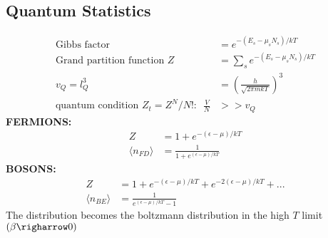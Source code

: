 \documentclass[a4paper, norsk, 8pt]{article}
\begin{document}
\begin{multicols*}{3}
\subsection*{\footnotesize  Quantum Statistics}
\begin{align*}
    \text{Gibbs factor} &= e^{-(E_s - \mu_{s} N_{s})/kT} \\
    \text{Grand partition function}\,\, Z &= \sum_s e^{-(E_s - \mu_s N_s)/kT} \\
    v_Q = l_Q^3 &= \left( \frac{h}{\sqrt{2\pi mkT}} \right)^3 \\
    \text{quantum condition $Z_t=Z^N/N!$:}\,\,\,\, \frac{V}{N} &>> v_Q
\end{align*}
\textbf{\textsc{FERMIONS:}}
\begin{align*}
    Z &= 1 + e^{-(\epsilon-\mu)/kT} \\
    \langle n_{FD} \rangle &= \frac{1}{1+e^{(\epsilon-\mu)/kT}}
\end{align*}
\textbf{\textsc{BOSONS:}}
\begin{align*}
    Z &= 1 + e^{-(\epsilon-\mu)/kT} + e^{-2(\epsilon-\mu)/kT} + ... \\
    \langle n_{BE} \rangle &= \frac{1}{e^{(\epsilon-\mu)/kT}-1}
\end{align*}
The distribution becomes the boltzmann distribution in the high $T$ limit $(\beta \righarrow 0 )$

\end{multicols*}
\end{document}
